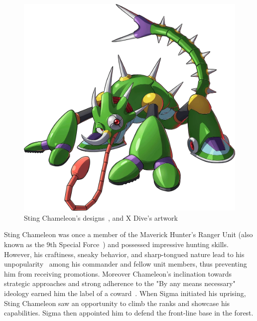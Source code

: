 \begin{figure}[htp]
	\includegraphics[height=\portraitsize]{figures/X1/Sting_chameleon/Sting_Chameleon.png}
	\caption{Sting Chameleon's designs~\cite{book:MMX_Complete_art}, and X Dive's artwork}
\end{figure}

Sting Chameleon was once a member of the Maverick Hunter's Ranger Unit (also known as the 9th Special Force~\cite{wayback:X_resources}) and possessed impressive hunting skills. However, his craftiness, sneaky behavior, and sharp-tongued nature lead to his unpopularity~\cite{Xcoll1:Manual_X1} among his commander and fellow unit members, thus preventing him from receiving promotions. Moreover Chameleon's inclination towards strategic approaches and strong adherence to the "By any means necessary" ideology earned him the label of a coward~\cite{MHX:manual}. When Sigma initiated his uprising, Sting Chameleon saw an opportunity to climb the ranks and showcase his capabilities. Sigma then appointed him to defend the front-line base in the forest.



